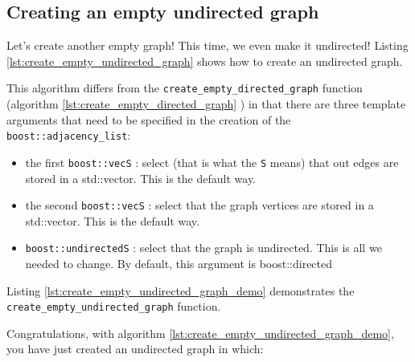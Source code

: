 \subsection{Creating an empty undirected graph}
\label{subsec:create_empty_undirected_graph}

Let's create another empty graph! This time, we even make it undirected!
Listing \ref{lst:create_empty_undirected_graph}
shows how to create an undirected graph.



This algorithm differs from the \verb;create_empty_directed_graph;
function (algorithm 
\ref{lst:create_empty_directed_graph}
) 
in that there are three template arguments that need to be specified in
the creation of the \verb;boost::adjacency_list;:

\begin{itemize}
  \item the first \verb;boost::vecS; : 
    select (that is what the \verb;S; 
    means) that out edges are stored in a std::vector.
    This is the default way.
  \item
    the second \verb;boost::vecS; : 
    select that the graph vertices are stored in a std::vector.
    This is the default way.
  \item
    \verb;boost::undirectedS; : 
    select that the graph is undirected.
    This is all we needed to change.
    By default, this argument is boost::directed 
\end{itemize}

Listing \ref{lst:create_empty_undirected_graph_demo}
demonstrates the \verb;create_empty_undirected_graph; function.



Congratulations, with algorithm \ref{lst:create_empty_undirected_graph_demo}, 
you have just created an undirected graph in which:

